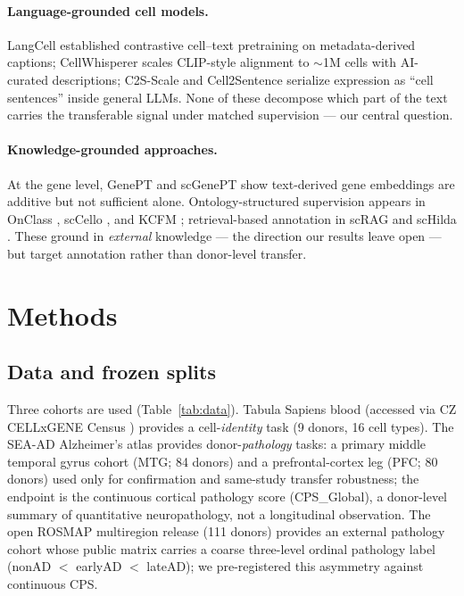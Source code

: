 \documentclass[11pt]{article}
\begin{document}
\paragraph{Language-grounded cell models.}
LangCell \citep{langcell} established contrastive cell--text pretraining
on metadata-derived captions; CellWhisperer \citep{cellwhisperer} scales
CLIP-style alignment to $\sim$1M cells with AI-curated descriptions;
C2S-Scale \citep{c2sscale} and Cell2Sentence \citep{cell2sentence}
serialize expression as ``cell sentences'' inside general LLMs. None of
these decompose which part of the text carries the transferable signal
under matched supervision --- our central question.

\paragraph{Knowledge-grounded approaches.}
At the gene level, GenePT \citep{genept} and scGenePT \citep{scgenept}
show text-derived gene embeddings are additive but not sufficient alone.
Ontology-structured supervision appears in OnClass \citep{onclass},
scCello \citep{sccello}, and KCFM \citep{kcfm}; retrieval-based
annotation in scRAG \citep{scrag} and scHilda \citep{schilda}. These
ground in \emph{external} knowledge --- the direction our results leave
open --- but target annotation rather than donor-level transfer.

\section{Methods}
\label{sec:methods}

\subsection{Data and frozen splits}
\label{sec:data}

Three cohorts are used (Table~\ref{tab:data}). Tabula Sapiens blood
\citep{tabulasapiens} (accessed via CZ CELLxGENE Census
\citep{cellxgene}) provides a cell-\emph{identity} task (9 donors, 16
cell types). The SEA-AD Alzheimer's atlas provides donor-\emph{pathology}
tasks: a primary middle temporal gyrus cohort (MTG; 84 donors) and a
prefrontal-cortex leg (PFC; 80 donors) used only for confirmation and
same-study transfer robustness; the endpoint is the continuous cortical
pathology score (CPS\_Global), a donor-level summary of quantitative
neuropathology, not a longitudinal observation. The open ROSMAP
multiregion release \citep{liu2025rosmap} (111 donors) provides an
external pathology cohort whose public matrix carries a coarse
three-level ordinal pathology label (nonAD $<$ earlyAD $<$ lateAD);
we pre-registered this asymmetry against continuous CPS.
\end{document}
